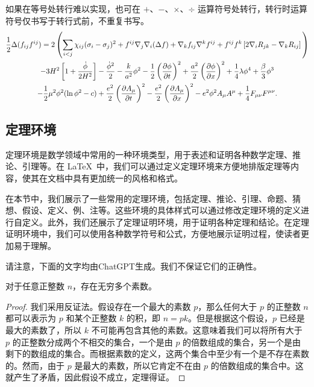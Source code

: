 如果在等号处转行难以实现，也可在 $+$、$-$、$\times$、$\div$ 运算符号处转行，转行时运算符号仅书写于转行式前，不重复书写。
\begin{multline}
  \frac{1}{2} \Delta (f_{ij} f^{ij}) =
  2 \left(\sum_{i<j} \chi_{ij}(\sigma_{i} - \sigma_{j})^{2}
  + f^{ij} \nabla_{j} \nabla_{i} (\Delta f)  + \nabla_{k} f_{ij} \nabla^{k} f^{ij} +
  f^{ij} f^{k} \left[2\nabla_{i}R_{jk}- \nabla_{k} R_{ij} \right] \vphantom{\sum_{i<j}} \right) \\
  - 3H^{2}\left[1+\frac{\dot{\phi}}{2H^2}\right] - \frac{\dot{\phi}^{2}}{2} - \frac{k}{a^{2}}\phi^{2} - \frac{1}{2}\left(\frac{\partial\phi}{\partial t}\right)^{2} + \frac{a^2}{2}\left(\frac{\partial\phi}{\partial x}\right)^{2}
  + \frac{1}{4}\lambda\phi^{4} + \frac{\beta}{3}\phi^{3} \\
  -\frac{1}{2}\mu^{2}\phi^{2}(\ln{\phi^{2}} - c)
  + \frac{e^{2}}{2}\left(\frac{\partial A_{\mu}}{\partial t}\right)^{2} - \frac{e^{2}}{2}\left(\frac{\partial A_{\mu}}{\partial x}\right)^{2}
  - e^{2}\phi^{2}A_{\mu}A^{\mu} + \frac{1}{4}F_{\mu\nu}F^{\mu\nu}.
\end{multline}

\subsection{定理环境}

定理环境是数学领域中常用的一种环境类型，用于表述和证明各种数学定理、推论、引理等。在 \LaTeX\ 中，我们可以通过定义定理环境来方便地排版定理等内容，使其在文档中具有更加统一的风格和格式。

在本节中，我们展示了一些常用的定理环境，包括定理、推论、引理、命题、猜想、假设、定义、例、注等。这些环境的具体样式可以通过修改定理环境的定义进行自定义。此外，我们还展示了定理证明环境，用于证明各种定理和结论。在定理证明环境中，我们可以使用各种数学符号和公式，方便地展示证明过程，使读者更加易于理解。

请注意，下面的文字均由ChatGPT生成。我们不保证它们的正确性。

\begin{thm}
  对于任意正整数 $n$，存在无穷多个素数。
\end{thm}

\begin{proof}
  我们采用反证法。假设存在一个最大的素数 $p$，那么任何大于 $p$ 的正整数 $n$ 都可以表示为 $p$ 和某个正整数 $k$ 的积，即 $n = pk$。但是根据这个假设，$p$ 已经是最大的素数了，所以 $k$ 不可能再包含其他的素数。这意味着我们可以将所有大于 $p$ 的正整数分成两个不相交的集合，一个是由 $p$ 的倍数组成的集合，另一个是由剩下的数组成的集合。而根据素数的定义，这两个集合中至少有一个是不存在素数的。然而，由于 $p$ 是最大的素数，所以它肯定不在由 $p$ 的倍数组成的集合中。这就产生了矛盾，因此假设不成立，定理得证。
\end{proof}

